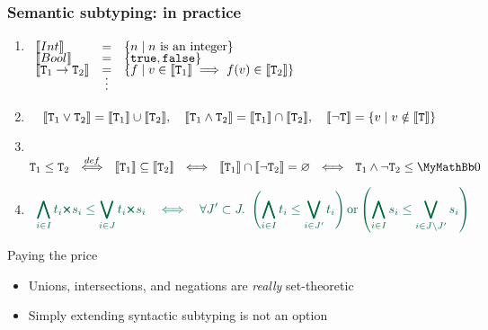 \begin{frame}\transdissolve
\frametitle{Semantic subtyping: in practice}
\pause
\begin{enumerate}
\item<2-> $\begin{array}[t]{lcl}
  \llbracket Int\rrbracket & = & \{ n \mid n \text{ is an integer} \}\\[-1mm]
  \llbracket Bool\rrbracket & = & \{ \texttt{true}, \texttt{false} \}\\[-1mm]
  \llbracket\texttt{T}_1\to\texttt{T}_2\rrbracket & = & \{ f \mid v\in\llbracket\texttt{T}_1\rrbracket\implies f(v)\in\llbracket\texttt{T}_2\rrbracket \}\\[-2mm]
  &\vdots
\end{array}$
\item<3-> ~~$\llbracket\texttt{T}_1\vee\texttt{T}_2\rrbracket = \llbracket\texttt{T}_1\rrbracket\cup\llbracket\texttt{T}_2\rrbracket, \quad
\llbracket\texttt{T}_1\wedge\texttt{T}_2\rrbracket = \llbracket\texttt{T}_1\rrbracket\cap\llbracket\texttt{T}_2\rrbracket, \quad
\llbracket\neg\texttt{T}\rrbracket = \{ v \mid v\notin\llbracket\texttt{T}\rrbracket \}$\\[4mm]
\item<4-> ~~$\T_1\leq\T_2 ~~\stackrel{def}{\Longleftrightarrow}~~ \sem{\T_1}\subseteq\sem{\T_2} ~~\Longleftrightarrow ~~ \sem{\T_1}\cap\sem{\neg\T_2}=\varnothing ~~ \Longleftrightarrow ~~ \T_1\And\neg\T_2\leq\Empty$\\
\item<5-> $\color{cadmiumgreen}
\begin{array}{l}
\displaystyle
\syncap_{i \in I} t_i \syntimes s_i \leq
  \syncup_{i \in J} t_i \syntimes s_i ~~\iff~~
\forall J' \subset J.~
\left(
\syncap_{i \in I} t_i \leq \syncup_{i \in J'} t_i
\right)
\mbox{or}
\left(
\syncap_{i \in I} s_i \leq \syncup_{i \in J \backslash J'} s_i
\right)
\end{array}
$
\end{enumerate}
\pause\pause\pause\pause
\begin{block}{Paying the price}
  \begin{itemize}\color{newgreen}
    \item[\textcolor{newgreen}{\ding{52}}] Unions, intersections, and negations are \emph{\sl really} set-theoretic\color{red}
    \item[\textcolor{red}{\ding{56}}] Simply extending syntactic subtyping is not an option
  \end{itemize}
\end{block}

\end{frame}



